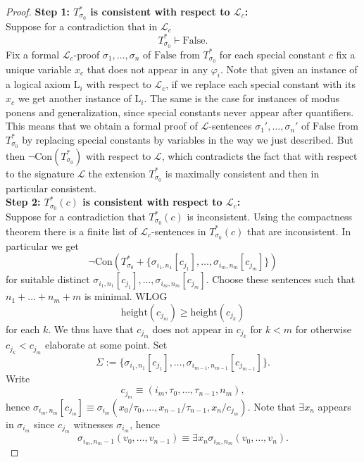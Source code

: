 \begin{proof}
    \textbf{Step 1: $T^\ast_{\sigma_0}$ is consistent with respect to $\mathcal{L}_c$:}\\
    Suppose for a contradiction that in $\mathcal{L}_c$
    $$
        T^\ast_{\sigma_0} \vdash \mathrm{False}.
    $$
    Fix a formal $\mathcal{L}_c$-proof $\sigma_1,\dots,\sigma_n$ of $\mathrm{False}$ from $T^\ast_{\sigma_0}$  
    for each special constant $c$ fix a unique variable $x_c$ that does not appear in any $\varphi_i$. Note that given an instance of a logical axiom $\mathrm{L}_i$ with respect to $\mathcal{L}_c$, if we replace each special constant with its $x_c$ we get another instance of $\mathrm{L}_i$. The same is the case for instances of modus ponens and generalization, since special constants never appear after quantifiers. This means that we obtain a formal proof of $\mathcal{L}$-sentences $\sigma_1',\dots,\sigma_n'$ of $\mathrm{False}$ from $T_{\sigma_0}^\ast$ by replacing special constants by variables in the way we just described. But then $\neg\mathrm{Con}(T^\ast_{\sigma_0})$ with respect to $\mathcal{L}$, which contradicts the fact that with respect to the signature $\mathcal{L}$ the extension $T_{\sigma_0}^\ast$ is maximally consistent and then in particular consistent.\\
    \textbf{Step 2: $T^\ast_{\sigma_0}(c)$ is consistent with respect to $\mathcal{L}_c$:}\\
    Suppose for a contradiction that $T_{\sigma_0}^\ast(c)$ is inconsistent. Using the compactness theorem there is a finite list of $\mathcal{L}_c$-sentences in $T^\ast_{\sigma_0}(c)$ that are inconsistent. In particular we get 
    $$
        \neg\mathrm{Con}(T^\ast_{\sigma_0}+\{\sigma_{i_1,n_1}[c_{j_1}],\dots,\sigma_{i_m,n_m}[c_{j_m}]\})
    $$
    for suitable distinct $\sigma_{i_1,n_1}[c_{j_1}],\dots,\sigma_{i_m,n_m}[c_{j_m}]$. Choose these sentences such that $n_1+\dots+n_m+m$ is minimal. WLOG 
    $$\mathrm{height}(c_{j_m}) \geq \mathrm{height}(c_{j_k})$$
    for each $k$. We thus have that $c_{j_m}$ does not appear in $c_{j_k}$ for $k<m$ for otherwise $c_{j_k}<c_{j_m}$ {\Large elaborate at some point}. Set
    $$
        \Sigma := \{\sigma_{i_1,n_1}[c_{j_1}],\dots,\sigma_{i_{m-1},n_{m-1}}[c_{j_{m-1}}]\}.
    $$
    Write 
    $$
        c_{j_m} \equiv (i_m,\tau_0,\dots,\tau_{n-1},n_m),
    $$  
    hence $\sigma_{i_m,n_m}[c_{j_m}]\equiv \sigma_{i_m}(x_0/\tau_0,\dots,x_{n-1}/\tau_{n-1},x_n/c_{j_m})$. Note that $\exists x_n$ appears in $\sigma_{i_m}$ since $c_{j_m}$ witnesses $\sigma_{i_m}$, hence
    $$\sigma_{i_m,n_m-1}(v_0,\dots,v_{n-1})\equiv \exists x_n \sigma_{i_m,n_m}(v_0,\dots,v_n).$$

\end{proof}
